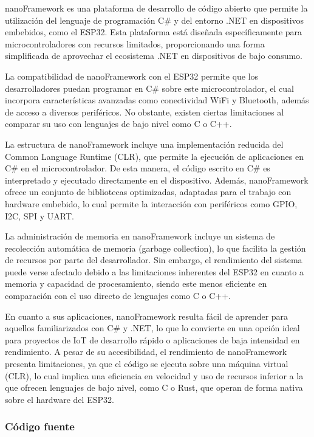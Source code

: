 nanoFramework \citep{nanoframework} es una plataforma de desarrollo de código abierto que permite la utilización del lenguaje de programación C\# y del entorno .NET en dispositivos embebidos, como el ESP32. Esta plataforma está diseñada específicamente para microcontroladores con recursos limitados, proporcionando una forma simplificada de aprovechar el ecosistema .NET en dispositivos de bajo consumo.

La compatibilidad de nanoFramework con el ESP32 permite que los desarrolladores puedan programar en C\# sobre este microcontrolador, el cual incorpora características avanzadas como conectividad WiFi y Bluetooth, además de acceso a diversos periféricos. No obstante, existen ciertas limitaciones al comparar su uso con lenguajes de bajo nivel como C o C++.

La estructura de nanoFramework incluye una implementación reducida del Common Language Runtime (CLR), que permite la ejecución de aplicaciones en C\# en el microcontrolador. De esta manera, el código escrito en C\# es interpretado y ejecutado directamente en el dispositivo. Además, nanoFramework ofrece un conjunto de bibliotecas optimizadas, adaptadas para el trabajo con hardware embebido, lo cual permite la interacción con periféricos como GPIO, I2C, SPI y UART.

La administración de memoria en nanoFramework incluye un sistema de recolección automática de memoria (garbage collection), lo que facilita la gestión de recursos por parte del desarrollador. Sin embargo, el rendimiento del sistema puede verse afectado debido a las limitaciones inherentes del ESP32 en cuanto a memoria y capacidad de procesamiento, siendo este menos eficiente en comparación con el uso directo de lenguajes como C o C++.

En cuanto a sus aplicaciones, nanoFramework resulta fácil de aprender para aquellos familiarizados con C\# y .NET, lo que lo convierte en una opción ideal para proyectos de IoT de desarrollo rápido o aplicaciones de baja intensidad en rendimiento. A pesar de su accesibilidad, el rendimiento de nanoFramework presenta limitaciones, ya que el código se ejecuta sobre una máquina virtual (CLR), lo cual implica una eficiencia en velocidad y uso de recursos inferior a la que ofrecen lenguajes de bajo nivel, como C o Rust, que operan de forma nativa sobre el hardware del ESP32.

\subsubsection{Código fuente}

